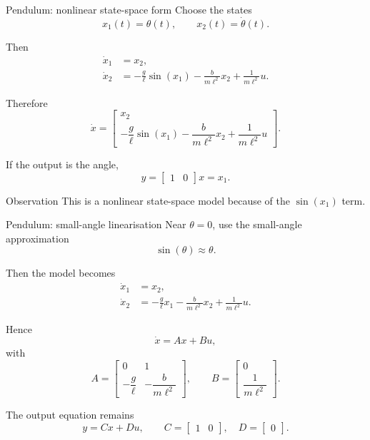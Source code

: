 \documentclass[aspectratio=169,10pt]{beamer}
\begin{document}
\begin{frame}{Pendulum: nonlinear state-space form}
Choose the states
\[
x_1(t)=\theta(t),\qquad x_2(t)=\dot{\theta}(t).
\]

Then
\begin{align*}
\dot{x}_1 &= x_2,\\
\dot{x}_2 &= -\frac{g}{\ell}\sin(x_1)-\frac{b}{m\ell^2}x_2+\frac{1}{m\ell^2}u.
\end{align*}

Therefore
\[
\dot{x}=
\begin{bmatrix}
x_2\\[4pt]
-\dfrac{g}{\ell}\sin(x_1)-\dfrac{b}{m\ell^2}x_2+\dfrac{1}{m\ell^2}u
\end{bmatrix}.
\]

If the output is the angle,
\[
y=\begin{bmatrix}1 & 0\end{bmatrix}x = x_1.
\]

\begin{notebox}{Observation}
This is a nonlinear state-space model because of the \(\sin(x_1)\) term.
\end{notebox}
\end{frame}

\begin{frame}{Pendulum: small-angle linearisation}
Near \(\theta=0\), use the small-angle approximation
\[
\sin(\theta)\approx \theta.
\]

Then the model becomes
\begin{align*}
\dot{x}_1 &= x_2,\\
\dot{x}_2 &= -\frac{g}{\ell}x_1-\frac{b}{m\ell^2}x_2+\frac{1}{m\ell^2}u.
\end{align*}

Hence
\[
\dot{x}=Ax+Bu,
\]
with
\[
A=
\begin{bmatrix}
0 & 1\\[4pt]
-\dfrac{g}{\ell} & -\dfrac{b}{m\ell^2}
\end{bmatrix},
\qquad
B=
\begin{bmatrix}
0\\[4pt]
\dfrac{1}{m\ell^2}
\end{bmatrix}.
\]

The output equation remains
\[
y=Cx+Du,\qquad
C=\begin{bmatrix}1 & 0\end{bmatrix},\quad D=\begin{bmatrix}0\end{bmatrix}.
\]
\end{frame}
\end{document}
